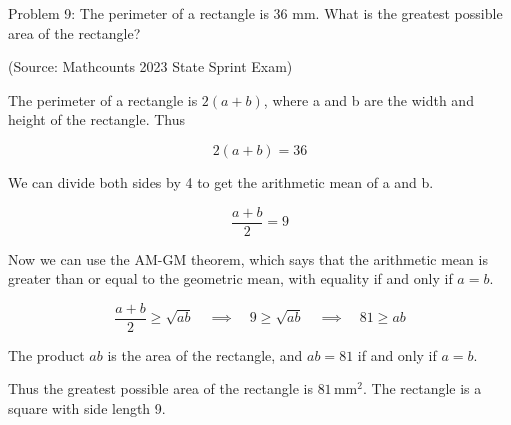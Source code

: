 Problem 9: The perimeter of a rectangle is 36 mm. What is the greatest possible area of the rectangle?

(Source: Mathcounts 2023 State Sprint Exam)

The perimeter of a rectangle is $2(a + b)$, where a and b are the width and height of the rectangle. Thus

$$ 2(a + b) = 36 $$

We can divide both sides by 4 to get the arithmetic mean of a and b.

$$ \frac{a + b}{2} = 9 $$

Now we can use the AM-GM theorem, which says that the arithmetic mean is greater than or equal to the geometric mean, with equality if and only if $a = b$.

$$ \frac{a + b}{2} \geq \sqrt{ab} \quad \implies \quad 9 \geq \sqrt{ab} \quad \implies \quad 81 \geq ab $$

The product $ab$ is the area of the rectangle, and $ab = 81$ if and only if $a = b$. 

Thus the greatest possible area of the rectangle is $\boxed{81 \, \text{mm}^2}$. The rectangle is a square with side length 9.
